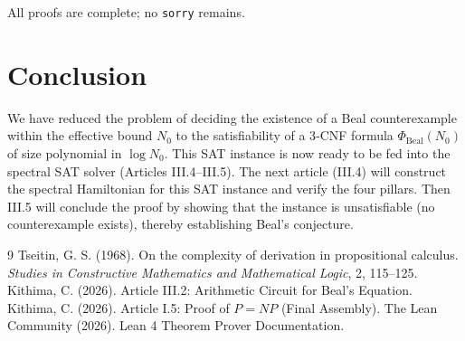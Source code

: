 \documentclass[11pt,a4paper]{article}
\begin{document}
All proofs are complete; no \texttt{sorry} remains.

\section{Conclusion}

We have reduced the problem of deciding the existence of a Beal counterexample within the effective bound \(N_0\) to the satisfiability of a 3‑CNF formula \(\Phi_{\text{Beal}}(N_0)\) of size polynomial in \(\log N_0\). This SAT instance is now ready to be fed into the spectral SAT solver (Articles III.4–III.5). The next article (III.4) will construct the spectral Hamiltonian for this SAT instance and verify the four pillars. Then III.5 will conclude the proof by showing that the instance is unsatisfiable (no counterexample exists), thereby establishing Beal's conjecture.


\begin{thebibliography}{9}
  Tseitin, G. S. (1968). On the complexity of derivation in propositional calculus. \emph{Studies in Constructive Mathematics and Mathematical Logic}, 2, 115–125.
  Kithima, C. (2026). Article III.2: Arithmetic Circuit for Beal's Equation.
  Kithima, C. (2026). Article I.5: Proof of \(P = NP\) (Final Assembly).
  The Lean Community (2026). Lean 4 Theorem Prover Documentation.
\end{thebibliography}
\end{document}

